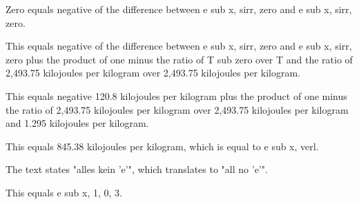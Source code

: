 Zero equals negative of the difference between e sub x, sirr, zero and e sub x, sirr, zero.

This equals negative of the difference between e sub x, sirr, zero and e sub x, sirr, zero plus the product of one minus the ratio of T sub zero over T and the ratio of 2,493.75 kilojoules per kilogram over 2,493.75 kilojoules per kilogram.

This equals negative 120.8 kilojoules per kilogram plus the product of one minus the ratio of 2,493.75 kilojoules per kilogram over 2,493.75 kilojoules per kilogram and 1.295 kilojoules per kilogram.

This equals 845.38 kilojoules per kilogram, which is equal to e sub x, verl.

The text states "alles kein 'e'", which translates to "all no 'e'".

This equals e sub x, 1, 0, 3.